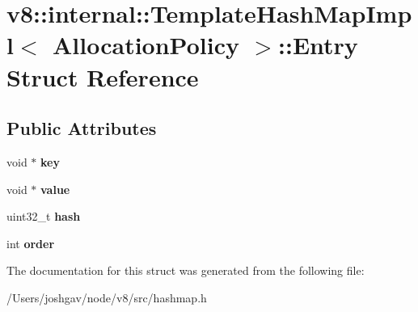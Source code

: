 \hypertarget{structv8_1_1internal_1_1_template_hash_map_impl_1_1_entry}{}\section{v8\+:\+:internal\+:\+:Template\+Hash\+Map\+Impl$<$ Allocation\+Policy $>$\+:\+:Entry Struct Reference}
\label{structv8_1_1internal_1_1_template_hash_map_impl_1_1_entry}
\subsection*{Public Attributes}
\begin{DoxyCompactItemize}
\item 
void $\ast$ {\bfseries key}\hypertarget{structv8_1_1internal_1_1_template_hash_map_impl_1_1_entry_ac1ea76644b61f79e68ecb194304ee061}{}\label{structv8_1_1internal_1_1_template_hash_map_impl_1_1_entry_ac1ea76644b61f79e68ecb194304ee061}

\item 
void $\ast$ {\bfseries value}\hypertarget{structv8_1_1internal_1_1_template_hash_map_impl_1_1_entry_ace4064a198d7ff4973271b4f55760cef}{}\label{structv8_1_1internal_1_1_template_hash_map_impl_1_1_entry_ace4064a198d7ff4973271b4f55760cef}

\item 
uint32\+\_\+t {\bfseries hash}\hypertarget{structv8_1_1internal_1_1_template_hash_map_impl_1_1_entry_a91e5f43b7e0ad093500c9bfb440e918e}{}\label{structv8_1_1internal_1_1_template_hash_map_impl_1_1_entry_a91e5f43b7e0ad093500c9bfb440e918e}

\item 
int {\bfseries order}\hypertarget{structv8_1_1internal_1_1_template_hash_map_impl_1_1_entry_aa5e8b361e3c5d19caceda476f1f8f1d4}{}\label{structv8_1_1internal_1_1_template_hash_map_impl_1_1_entry_aa5e8b361e3c5d19caceda476f1f8f1d4}

\end{DoxyCompactItemize}


The documentation for this struct was generated from the following file\+:\begin{DoxyCompactItemize}
\item 
/\+Users/joshgav/node/v8/src/hashmap.\+h\end{DoxyCompactItemize}
